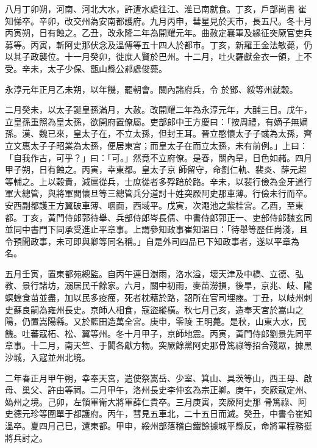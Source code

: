\begin{pinyinscope}
 八月丁卯朔，河南、河北大水，許遭水處往江、淮已南就食。丁亥，戶部尚書
 崔知悌卒。辛卯，改交州為安南都護府。九月丙申，彗星見於天市，長五尺。冬十月丙寅朔，日有蝕之。乙丑，改永隆二年為開耀元年。曲赦定襄軍及緣征突厥官吏兵募等。丙寅，斬阿史那伏念及溫傅等五十四人於都市。丁亥，新羅王金法敏薨，仍以其子政襲位。十一月癸卯，徙庶人賢於巴州。十二月，吐火羅獻金衣一領，上不受。辛未，太子少保、甑山縣公郝處俊薨。



 永淳元年正月乙未朔，以年饑，罷朝會。關內諸府兵，令
 於鄧、綏等州就穀。



 二月癸未，以太子誕皇孫滿月，大赦。改開耀二年為永淳元年，大酺三日。戊午，立皇孫重照為皇太孫，欲開府置僚屬。吏部郎中王方慶曰：「按周禮，有嫡子無嫡孫。漢、魏已來，皇太子在，不立太孫，但封王耳。晉立愍懷太子子彧為太孫，齊立文惠太子子昭業為太孫，便居東宮；而皇太子在而立太孫，未有前例。」上曰：「自我作古，可乎？」曰：「可。」然竟不立府僚。是春，關內旱，日色如赭。四月甲子朔，日有蝕之。丙寅，幸東都。皇太子京
 師留守，命劉仁軌、裴炎、薛元超等輔之。上以穀貴，減扈從兵，士庶從者多殍踣於路。辛未，以裴行儉為金牙道行軍大總管，與將軍閻懷旦等三總管兵分道討十姓突厥阿史那車薄。行儉未行而卒。安西副都護王方翼破車薄、咽面，西域平。戊寅，次澠池之紫桂宮。乙酉，至東都。丁亥，黃門侍郎郭待舉、兵部侍郎岑長倩、中書侍郎郭正一、吏部侍郎魏玄同並同中書門下同承受進止平章事。上謂參知政事崔知溫曰：「待舉等歷任尚淺，且
 令預聞政事，未可即與卿等同名稱。」自是外司四品已下知政事者，遂以平章為名。



 五月壬寅，置東都苑總監。自丙午連日澍雨，洛水溢，壞天津及中橋、立德、弘教、景行諸坊，溺居民千餘家。六月，關中初雨，麥苗澇損，後旱，京兆、岐、隴螟蝗食苗並盡，加以民多疫癘，死者枕藉於路，詔所在官司埋瘞。丁丑，以岐州刺史蘇良嗣為雍州長史。京師人相食，寇盜縱橫。秋七月己亥，造奉天宮於嵩山之陽，仍置嵩陽縣。又於藍田造萬全宮。庚申，零陵
 王明薨。是秋，山東大水，民饑。吐蕃寇柘、松、翼等州。冬十月甲子，京師地震。丙寅，黃門侍郎劉景先同平章事。十二月，南天竺、于闐各獻方物。突厥餘黨阿史那骨篤祿等招合殘眾，據黑沙城，入寇並州北境。



 二年春正月甲午朔，幸奉天宮，遣使祭嵩岳、少室、箕山、具茨等山，西王母、啟母、巢父、許由等祠。二月甲午，洛州長史李仲玄為宗正卿。庚午，突厥寇定州、媯州之境。己卯，左領軍衛大將軍薛仁貴卒。三月庚寅，突厥阿史那
 骨篤祿、阿史德元珍等圍單于都護府。丙午，彗見五車北，二十五日而滅。癸丑，中書令崔知溫卒。夏四月己巳，還東都。甲申，綏州部落稽白鐵餘據城平縣反，命將軍程務挺將兵討之。




\end{pinyinscope}
